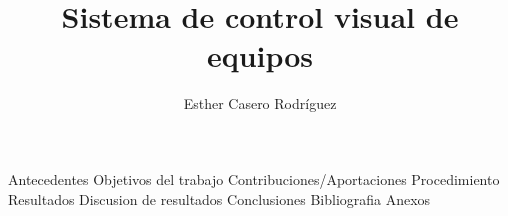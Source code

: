 \documentclass[10pt,a4paper]{book}
\author{Esther Casero Rodríguez}
\title{Sistema de control visual de equipos}
\begin{document}





Antecedentes
Objetivos del trabajo
Contribuciones/Aportaciones
Procedimiento
Resultados
Discusion de resultados
Conclusiones
Bibliografia
Anexos
\end{document}
